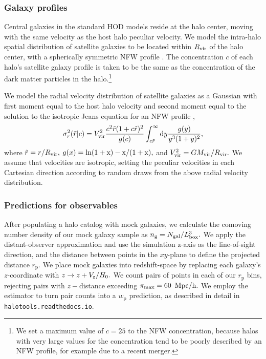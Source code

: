 \documentclass[usenatbib,usegraphicx,letterpaper]{mn2e}
\newcommand{\mvir}{M_{\rm vir}}
\newcommand{\rvir}{R_{\rm vir}}
\newcommand{\wprp}{w_{\mathrm{p}}}
\newcommand{\rp}{r_{\mathrm{p}}}
\begin{document}
\subsubsection{Galaxy profiles}

Central galaxies in the standard HOD models reside at the halo center, 
moving with the same velocity as the host halo peculiar velocity. We model 
the intra-halo spatial distribution of satellite galaxies to be located within $\rvir$ 
of the halo center, with a spherically symmetric NFW profile \citep{nfw97}. 
The concentration $c$ of each halo's satellite galaxy profile is taken to be 
the same as the concentration of the dark matter particles in the 
halo.\footnote{We set a maximum value of $c=25$ to the NFW concentration, 
because halos with very large values for the concentration tend to be poorly 
described by an NFW profile, for example due to a recent merger.}


We model the radial velocity distribution of satellite galaxies as a Gaussian with 
first moment equal to the host halo velocity and second moment equal to the 
solution to the isotropic Jeans equation for an NFW profile \citep{more09b}, 
\begin{equation}
\sigma^{2}_{r}(\tilde{r}|c) = V_{\rm vir}^{2}\frac{c^{2}\tilde{r}(1 + c\tilde{r})^{2}}{g(c)}\int_{c\tilde{r}}^{\infty}{\rm d}y\frac{g(y)}{y^{3}(1 + y)^{2}}, 
\end{equation}
where $\tilde{r} = r/\rvir,$ $g(x) = \rm{ln}(1+x) - x / (1+x),$ and $V_{\rm vir}^{2} = G\mvir/\rvir.$ 
We assume that velocities are isotropic, setting the peculiar velocities in each Cartesian direction 
according to random draws from the above radial velocity distribution. 

\subsubsection{Predictions for observables}

After populating a halo catalog with mock galaxies, we calculate the comoving number density of our mock galaxy sample as $n_{\rm g} = N_{\rm gal} / L_{\rm box}^3.$ We apply the distant-observer approximation and use the simulation z-axis as the line-of-sight direction, and the distance between points in the $xy$-plane to define the projected distance $\rp.$ We place mock galaxies into redshift-space by replacing each galaxy's $z$-coordinate with $z \rightarrow z + V_{\rm z}/H_0.$ We count pairs of points in each of our $\rp$ bins, rejecting pairs with $z-$distance exceeding $\pi_{\rm max}=60$ ${\rm Mpc/h.}$ We employ the \citet{landyszalay93} estimator to turn pair counts into a $\wprp$ prediction, as described in detail in {\tt halotools.readthedocs.io}. 
\end{document}

